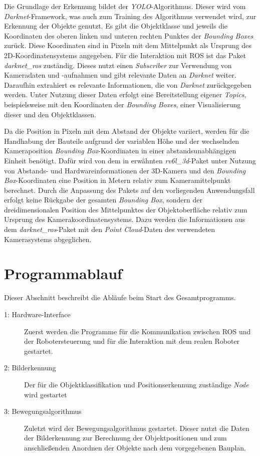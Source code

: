 Die Grundlage der Erkennung bildet der \textit{\ac{YOLO}}-Algorithmus. Dieser wird vom \textit{Darknet}-Framework, was auch zum Training des Algorithmus verwendet wird, zur Erkennung der Objekte genutzt.  Es gibt die Objektklasse und jeweils die Koordinaten des oberen linken und unteren rechten Punktes der \textit{Bounding Boxes} zurück. Diese Koordinaten sind in Pixeln mit dem Mittelpunkt als Ursprung des 2D-Koordinatensystems angegeben. Für die Interaktion mit \ac{ROS} ist das Paket \textit{darknet\_ros} zuständig. Dieses nutzt einen \textit{Subscriber} zur Verwendung von Kameradaten und -aufnahmen und gibt relevante Daten an \textit{Darknet} weiter. Daraufhin extrahiert es relevante Informationen, die von \textit{Darknet} zurückgegeben werden. Unter Nutzung dieser Daten erfolgt eine Bereitstellung eigener \textit{Topics}, beispielsweise mit den Koordinaten der \textit{Bounding Boxes}, einer Visualisierung dieser und den Objektklassen.

Da die Position in Pixeln mit dem Abstand der Objekte variiert, werden für die Handhabung der Bauteile aufgrund der variablen Höhe und der wechselnden Kameraposition \textit{Bounding Box}-Koordinaten in einer abstandsunabhängigen Einheit benötigt. Dafür wird von dem in  erwähnten \textit{rv6l\_3d}-Paket unter Nutzung von Abstands- und Hardwareinformationen der 3D-Kamera und den \textit{Bounding Box}-Koordinaten eine Position in Metern relativ zum Kameramittelpunkt berechnet. Durch die Anpassung des Pakets auf den vorliegenden Anwendungsfall erfolgt keine Rückgabe der gesamten \textit{Bounding Box}, sondern der dreidimensionalen Position des Mittelpunktes der Objektoberfläche relativ zum Ursprung des Kamerakoordinatensystems. Dazu werden die Informationen aus dem \textit{darknet\_ros}-Paket mit den \textit{Point Cloud}-Daten des verwendeten Kamerasystems abgeglichen.

\section{Programmablauf}
Dieser Abschnitt beschreibt die Abläufe beim Start des Gesamtprogramms.

\begin{description}
    \item[1: Hardware-Interface] Zuerst werden die Programme für die Kommunikation zwischen \ac{ROS} und der Robotersteuerung und für die Interaktion mit dem realen Roboter gestartet.
    \item[2: Bilderkennung] Der für die Objektklassifikation und Positionserkennung zuständige \textit{Node} wird gestartet
    \item[3: Bewegungsalgorithmus] Zuletzt wird der Bewegungsalgorithmus gestartet. Dieser nutzt die Daten der Bilderkennung zur Berechnung der Objektpositionen und zum anschließenden Anordnen der Objekte nach dem vorgegebenen Bauplan.
\end{description}

